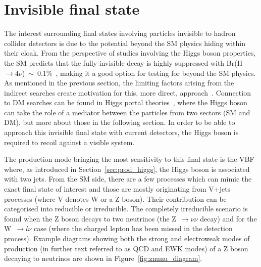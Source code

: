 

\section{Invisible final state}
\hspace{10pt} The interest surrounding final states involving particles invisible to hadron collider detectors is due to the potential beyond the SM physics hiding within their cloak. From the perspective of studies involving the Higgs boson properties, the SM predicts that the fully invisible decay is highly suppressed with Br(H~$\rightarrow4\nu$)~$\sim$~0.1\%~\cite{report_lhcxswg_3}, making it a good option for testing for beyond the SM physics. As mentioned in the previous section, the limiting factors arising from the indirect searches create motivation for this, more direct, approach~\cite{paper:hinv_run1,paper:HIG_17_023,Patrick,Riccardo}. Connection to DM searches can be found in Higgs portal theories~\cite{paper:hig_portal_models1,paper:hig_portal_models2,paper:hig_portal_models3,paper:hig_portal_models4}, where the Higgs boson can take the role of a mediator between the particles from two sectors (SM and DM), but more about those in the following section. In order to be able to approach this invisible final state with current detectors, the Higgs boson is required to recoil against a visible system.

\hspace{10pt} The production mode bringing the most sensitivity to this final state is the VBF where, as introduced in Section~\ref{sec:prod_higgs}, the Higgs boson is associated with two jets. From the SM side, there are a few processes which can mimic the exact final state of interest and those are mostly originating from V+jets processes (where V denotes W or a Z boson). Their contribution can be categorised into reducible or irreducible. The completely irreducible scenario is found when the Z boson decays to two neutrinos (the Z~$\rightarrow\nu\nu$ decay) and for the W~$\rightarrow l\nu$ case (where the charged lepton has been missed in the detection process). Example diagrams showing both the strong and electroweak modes of production (in further text referred to as QCD and EWK modes) of a Z boson decaying to neutrinos are shown in Figure~\ref{fig:znunu_diagram}. 

